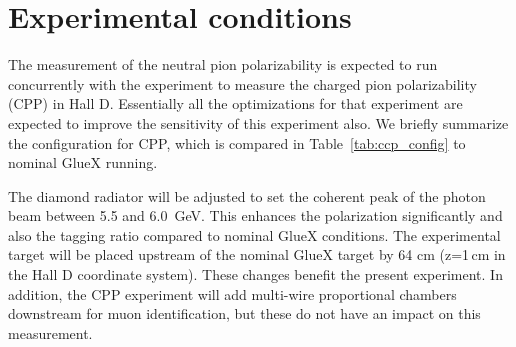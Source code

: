 
\section{Experimental conditions}
The measurement of the neutral pion polarizability is expected to run
concurrently with the experiment to measure the charged pion
polarizability (CPP) \cite{CPPexp} in Hall D. Essentially all the
optimizations for that experiment are expected to improve the
sensitivity of this experiment also. We briefly summarize the
configuration for CPP, which is compared in
Table~\ref{tab:ccp_config} to nominal GlueX running.  
 
The diamond radiator will be adjusted to set the coherent peak of the
photon beam between 5.5 and 6.0~GeV. This enhances the polarization
significantly and also the tagging ratio compared to nominal GlueX conditions.
The experimental target
will be placed upstream of the nominal GlueX target by 64 cm (z=1\,cm
in the Hall D coordinate system). These changes benefit the present
experiment. In addition, the CPP experiment will add multi-wire
proportional chambers downstream for muon identification, but these do
not have an impact on this measurement.
 
